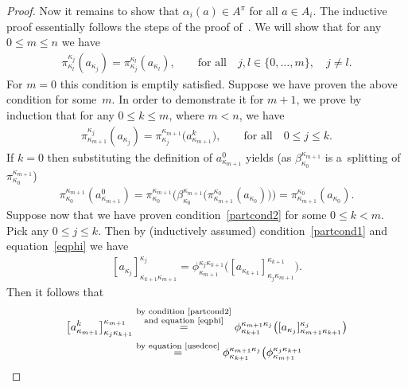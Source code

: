 \documentclass[11pt]{article}
\begin{document}
\begin{proof}
Now it remains to show that $\alpha_i(a)\in A^\pi$ for all $a\in A_i$.
The inductive proof essentially follows the steps of the proof of~\cite[Proposition~9]{CM2000}.
We will show that for any $0\leq m\leq n$ we have
\begin{gather}
\label{partcond1}
\pi^{\kappa_j}_{\kappa_l}(a_{\kappa_j})=\pi^{\kappa_l}_{\kappa_j}(a_{\kappa_l}),
\qquad
\text{for all}
\quad
j,l\in\{0,\ldots,m\},
\quad
j\neq l.
\end{gather}
For $m=0$ this condition is emptily satisf\/ied.
Suppose we have proven the above condition for some~$m$.
In order to demonstrate it for $m+1$, we prove by induction that for any $0\leq k\leq m$, where $m<n$, we have
\begin{gather}
\label{partcond2}
\pi^{\kappa_j}_{\kappa_{m+1}}(a_{\kappa_j})=\pi^{\kappa_{m+1}}_{\kappa_j}\big(a^k_{\kappa_{m+1}}\big),
\qquad
\text{for all}
\quad
0\leq j\leq k.
\end{gather}
If $k=0$ then substituting the def\/inition of $a^0_{\kappa_{m+1}}$ yields (as $\beta^{\kappa_{m+1}}_{\kappa_0}$ is
a~splitting of $\pi^{\kappa_{m+1}}_{\kappa_0}$)
\begin{gather*}
\pi^{\kappa_{m+1}}_{\kappa_0}(a^0_{\kappa_{m+1}}) =\pi^{\kappa_{m+1}}_{\kappa_0}
\big(\beta^{\kappa_{m+1}}_{\kappa_0}\big(\pi^{\kappa_0}_{\kappa_{m+1}}(a_{\kappa_0})\big)\big)
 =\pi^{\kappa_0}_{\kappa_{m+1}}(a_{\kappa_0}).
\end{gather*}
Suppose now that we have proven condition~\eqref{partcond2} for some $0\leq k<m$.
Pick any $0\leq j\leq k$.
Then by (inductively assumed) condition~\eqref{partcond1} and equation~\eqref{eqphi} we have
\begin{gather}
\label{usedcoc}
[a_{\kappa_j}]^{\kappa_j}_{\kappa_{k+1}\kappa_{m+1}}=\phi^{\kappa_j\kappa_{k+1}}_{\kappa_{m+1}}
\big([a_{\kappa_{k+1}}]^{\kappa_{k+1}}_{\kappa_j\kappa_{m+1}}\big).
\end{gather}
Then it follows that
\begin{gather*}
\big[a^k_{\kappa_{m+1}}\big]^{\kappa_{m+1}}_{\kappa_j\kappa_{k+1}}
\overset{\substack{\text{by condition~\eqref{partcond2}} \\ \text{and equation~\eqref{eqphi}}}}{=}\phi^{\kappa_{m+1}\kappa_j}_{\kappa_{k+1}}
\big([a_{\kappa_j}]^{\kappa_j}_{\kappa_{m+1}\kappa_{k+1}}\big)
\\
\qquad{}
\overset{\text{by equation~\eqref{usedcoc}}}{=}
\phi^{\kappa_{m+1}\kappa_j}_{\kappa_{k+1}}\big(\phi^{\kappa_j\kappa_{k+1}}_{\kappa_{m+1}}

\end{gather*}
\end{proof}
\end{document}
